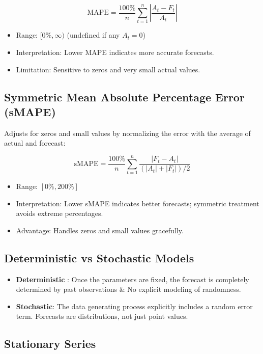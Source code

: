 \documentclass[10pt,a4paper]{article}
\begin{document}
	\[
	\text{MAPE} = \frac{100\%}{n} \sum_{t=1}^{n} \left| \frac{A_t - F_t}{A_t} \right|
	\]
	
	\begin{itemize}
	    \item Range: $[0\%, \infty)$ (undefined if any $A_t = 0$)
	    \item Interpretation: Lower MAPE indicates more accurate forecasts.
	    \item Limitation: Sensitive to zeros and very small actual values.
	\end{itemize}
	
	\subsection{Symmetric Mean Absolute Percentage Error (sMAPE)} 
	Adjusts for zeros and small values by normalizing the error with the average of actual and forecast:
	
	\[
	\text{sMAPE} = \frac{100\%}{n} \sum_{t=1}^{n} \frac{|F_t - A_t|}{(|A_t| + |F_t|)/2}
	\]
	
	\begin{itemize}
	    \item Range: $[0\%, 200\%]$
	    \item Interpretation: Lower sMAPE indicates better forecasts; symmetric treatment avoids extreme percentages.
	    \item Advantage: Handles zeros and small values gracefully.
	\end{itemize}
	
	
	
	\subsection{Deterministic vs Stochastic Models}
	\begin{itemize}
	    \item \textbf{Deterministic} : Once the parameters are fixed, the forecast is completely determined by past observations \& No explicit modeling of randomness.
	    \item \textbf{Stochastic}: The data generating process explicitly includes a random error term. Forecasts are distributions, not just point values.
	\end{itemize}
	
	\subsection{Stationary Series}
	
\end{document}
